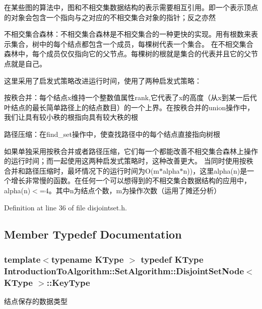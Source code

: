 在某些图的算法中，图和不相交集数据结构的表示需要相互引用。即一个表示顶点的对象会包含一个指向与之对应的不相交集合对象的指针；反之亦然

不相交集合森林：不相交集合森林是不相交集合的一种更快的实现。用有根数来表示集合，树中的每个结点都包含一个成员，每棵树代表一个集合。 在不相交集合森林中，每个成员仅仅指向它的父节点。每棵树的根就是集合的代表并且它的父节点就是自己。

这里采用了启发式策略改进运行时间，使用了两种启发式策略：
\begin{DoxyItemize}
\item 按秩合并：每个结点x维持一个整数值属性rank,它代表了x的高度（从x到某一后代叶结点的最长简单路径上的结点数目）的一个上界。在按秩合并的union操作中， 我们让具有较小秩的根指向具有较大秩的根
\item 路径压缩：在{\ttfamily find\+\_\+set}操作中，使查找路径中的每个结点直接指向树根
\end{DoxyItemize}

如果单独采用按秩合并或者路径压缩，它们每一个都能改善不相交集合森林上操作的运行时间；而一起使用这两种启发式策略时，这种改善更大。 当同时使用按秩合并和路径压缩时，最坏情况下的运行时间为\+O(m$\ast$alpha$\ast$n))，这里alpha(n)是一个增长非常慢的函数。在任何一个可以想得到的不相交集合数据结构的应用中， alpha(n)$<$=4。其中n为结点个数，m为操作次数（运用了摊还分析） 

Definition at line 36 of file disjointset.\+h.



\subsection{Member Typedef Documentation}
\hypertarget{struct_introduction_to_algorithm_1_1_set_algorithm_1_1_disjoint_set_node_a8f801679de129d80a99ad683430c534a}{}
\subsubsection[{Key\+Type}]{\setlength{\rightskip}{0pt plus 5cm}template$<$typename K\+Type $>$ typedef K\+Type {\bf Introduction\+To\+Algorithm\+::\+Set\+Algorithm\+::\+Disjoint\+Set\+Node}$<$ K\+Type $>$\+::{\bf Key\+Type}}\label{struct_introduction_to_algorithm_1_1_set_algorithm_1_1_disjoint_set_node_a8f801679de129d80a99ad683430c534a}
结点保存的数据类型 

